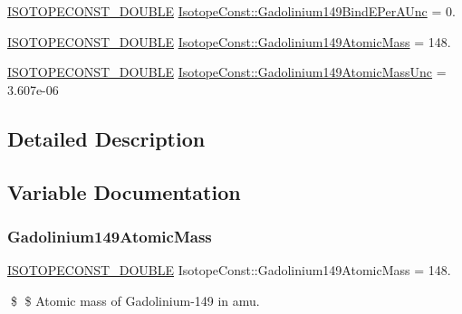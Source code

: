 \begin{DoxyCompactItemize}
\mbox{\hyperlink{group___isotope_const-_macros_ga8f45a7272ce02c0b4c65c44636ed719a}{I\+S\+O\+T\+O\+P\+E\+C\+O\+N\+S\+T\+\_\+\+D\+O\+U\+B\+LE}} \mbox{\hyperlink{group___isotope_const-_gadolinium-_gd149_ga4f2fd43e652a31504dd5a139dedc4673}{Isotope\+Const\+::\+Gadolinium149\+Bind\+E\+Per\+A\+Unc}} = 0.
\item 
\mbox{\hyperlink{group___isotope_const-_macros_ga8f45a7272ce02c0b4c65c44636ed719a}{I\+S\+O\+T\+O\+P\+E\+C\+O\+N\+S\+T\+\_\+\+D\+O\+U\+B\+LE}} \mbox{\hyperlink{group___isotope_const-_gadolinium-_gd149_ga09d2259d5efd6dfff71b0cdb0a8316a2}{Isotope\+Const\+::\+Gadolinium149\+Atomic\+Mass}} = 148.
\item 
\mbox{\hyperlink{group___isotope_const-_macros_ga8f45a7272ce02c0b4c65c44636ed719a}{I\+S\+O\+T\+O\+P\+E\+C\+O\+N\+S\+T\+\_\+\+D\+O\+U\+B\+LE}} \mbox{\hyperlink{group___isotope_const-_gadolinium-_gd149_gae77a6a4b1cd93b943eabe29934ff218c}{Isotope\+Const\+::\+Gadolinium149\+Atomic\+Mass\+Unc}} = 3.\+607e-\/06
\end{DoxyCompactItemize}


\subsection{Detailed Description}


\subsection{Variable Documentation}
\mbox{\label{group___isotope_const-_gadolinium-_gd149_ga09d2259d5efd6dfff71b0cdb0a8316a2}} 
\subsubsection{\texorpdfstring{Gadolinium149\+Atomic\+Mass}{Gadolinium149AtomicMass}}
{\footnotesize\ttfamily \mbox{\hyperlink{group___isotope_const-_macros_ga8f45a7272ce02c0b4c65c44636ed719a}{I\+S\+O\+T\+O\+P\+E\+C\+O\+N\+S\+T\+\_\+\+D\+O\+U\+B\+LE}} Isotope\+Const\+::\+Gadolinium149\+Atomic\+Mass = 148.}

\$ \$ Atomic mass of Gadolinium-\/149 in amu. \mbox{\label{group___isotope_const-_gadolinium-_gd149_gae77a6a4b1cd93b943eabe29934ff218c}} 

